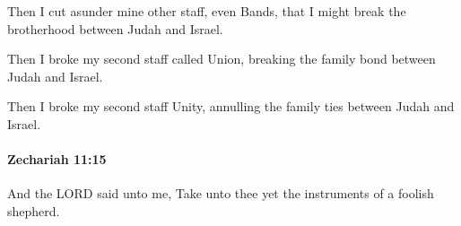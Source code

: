 			\begin{versebox}
					\item[BHS] 
					\item[LXX] 
					\item[ASV] Then I cut asunder mine other staff, even Bands, that I might break the brotherhood between Judah and Israel.
					\item[NIV] Then I broke my second staff called Union, breaking the family bond between Judah and Israel.
					\item[NRSV] Then I broke my second staff Unity, annulling the family ties between Judah and Israel.
			\end{versebox}

		\paragraph{Zechariah 11:15} %
			\label{ZECHARIAH-11-15}

			And the LORD said unto me, Take unto thee yet the instruments of a foolish shepherd.

